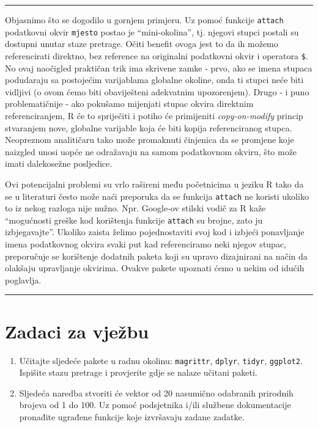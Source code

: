 \documentclass[]{book}
\theoremstyle{definition}
\theoremstyle{definition}
\theoremstyle{definition}
\theoremstyle{remark}
\begin{document}
\begin{center}\rule{0.5\linewidth}{\linethickness}\end{center}

Objasnimo što se dogodilo u gornjem primjeru. Uz pomoć funkcije
\texttt{attach} podatkovni okvir \texttt{mjesto} postao je
``mini-okolina'', tj. njegovi stupci postali su dostupni unutar staze
pretrage. Očiti benefit ovoga jest to da ih možemo referencirati
direktno, bez reference na originalni podatkovni okvir i operatora
\texttt{\$}. No ovaj naočigled praktičan trik ima skrivene zamke - prvo,
ako se imena stupaca podudaraju sa postojećim varijablama globalne
okoline, onda ti stupci neće biti vidljivi (o ovom ćemo biti
obaviješteni adekvatnim upozorenjem). Drugo - i puno problematičnije -
ako pokušamo mijenjati stupac okvira direktnim referenciranjem, R će to
spriječiti i potiho će primijeniti \emph{copy-on-modify} princip
stvaranjem nove, globalne varijable koja će biti kopija referenciranog
stupca. Neopreznom analitičaru tako može promaknuti činjenica da se
promjene koje naizgled unosi uopće ne odražavaju na samom podatkovnom
okviru, što može imati dalekosežne posljedice.

Ovi potencijalni problemi su vrlo rašireni među početnicima u jeziku R
tako da se u literaturi često može naći preporuka da se funkcija
\texttt{attach} ne koristi ukoliko to iz nekog razloga nije nužno. Npr.
Google-ov stilski vodič za R kaže ``mogućnosti greške kod korištenja
funkcije \texttt{attach} su brojne, zato ju izbjegavajte''. Ukoliko
zaista želimo pojednostaviti svoj kod i izbjeći ponavljanje imena
podatkovnog okvira svaki put kad referenciramo neki njegov stupac,
preporučuje se korištenje dodatnih paketa koji su upravo dizajnirani na
način da olakšaju upravljanje okvirima. Ovakve pakete upoznati ćemo u
nekim od idućih poglavlja.

\begin{center}\rule{0.5\linewidth}{\linethickness}\end{center}

\section*{Zadaci za vježbu}\label{zadaci-za-vjezbu-4}

\begin{enumerate}
\def\labelenumi{\arabic{enumi}.}
\item
  Učitajte sljedeće pakete u radnu okolinu: \texttt{magrittr},
  \texttt{dplyr}, \texttt{tidyr}, \texttt{ggplot2}. Ispišite stazu
  pretrage i provjerite gdje se nalaze učitani paketi.
\item
  Sljedeća naredba stvoriti će vektor od 20 nasumično odabranih
  prirodnih brojeva od 1 do 100. Uz pomoć podsjetnika i/ili službene
  dokumentacije pronađite ugrađene funkcije koje izvršavaju zadane
  zadatke.
\end{enumerate}
\end{document}
